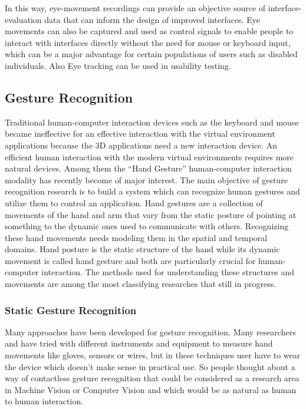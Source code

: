 	In this way, eye-movement recordings can provide an objective source of interface-evaluation data that can inform the design of improved interfaces. Eye movements can also be captured and used as control signals to enable people to interact with interfaces directly without the need for mouse or keyboard input, which can be a major advantage for certain populations of users such as disabled individuals. Also Eye tracking can be used in usability testing.\cite{poole2006eye}

\subsection{Gesture Recognition}
Traditional human-computer interaction devices such as the keyboard and mouse became ineffective for an effective interaction with the virtual environment applications because the 3D applications need a new interaction device. An efficient human interaction with the modern virtual environments requires more natural devices. Among them the “Hand Gesture” human-computer interaction modality has recently become of major interest. The main objective of gesture recognition research is to build a system which can recognize human gestures and utilize them to control an application. Hand gestures are a collection of movements of the hand and arm that vary from the static posture of pointing at something to the dynamic ones used to communicate with others. Recognizing these hand movements needs modeling them in the
spatial and temporal domains. Hand posture is the static structure of the hand while its dynamic movement is called hand gesture and both are particularly crucial for human-computer interaction. The methods used for understanding these structures and movements are among the most classifying researches that still in progress.
\bigskip

\subsubsection{Static Gesture Recognition}

Many approaches have been developed for gesture recognition. Many researchers \cite{yrel7} and \cite{yrel16} have tried with different instruments and equipment to measure hand movements like gloves, sensors or wires, but in these techniques user have to wear the device which doesn’t make sense in practical use. So people thought about a way of contactless gesture recognition that could be considered as a research area in Machine Vision or Computer Vision and which would be as natural as human to human interaction.
\bigskip

